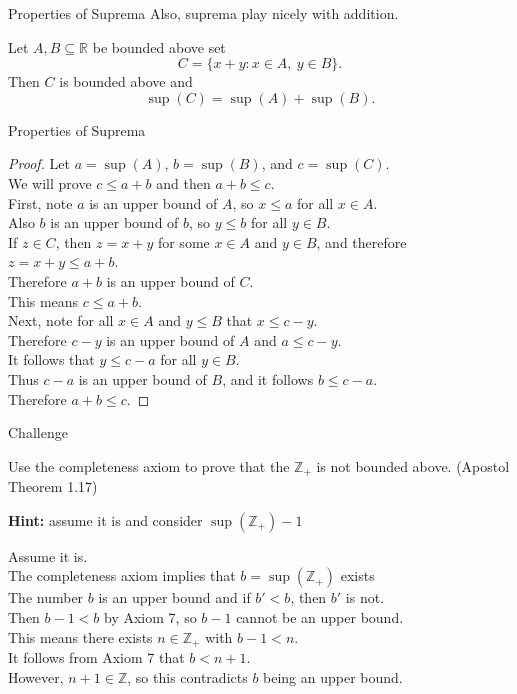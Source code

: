 \documentclass{beamer}
\begin{document}
\begin{frame}{Properties of Suprema}
Also, suprema play nicely with addition.
\begin{thm}
Let $A,B\subseteq\mathbb{R}$ be bounded above set
$$C = \{x+y: x\in A,\ y\in B\}.$$
Then $C$ is bounded above and
$$\sup(C) = \sup(A) + \sup(B).$$
\end{thm}
\end{frame}
\begin{frame}{Properties of Suprema}
\begin{proof}
Let $a = \sup(A)$, $b = \sup(B)$, and $c=\sup(C)$. \\
\pause
We will prove $c \leq a+b$ and then $a+b\leq c$. \\
\pause
First, note $a$ is an upper bound of $A$, so $x\leq a$ for all $x\in A$. \\
\pause
Also $b$ is an upper bound of $b$, so $y\leq b$ for all $y\in B$. \\
\pause
If $z\in C$, then $z=x+y$ for some $x\in A$ and $y\in B$, and therefore $z = x+y \leq a+b$. \\
\pause
Therefore $a+b$ is an upper bound of $C$. \\
\pause
This means $c\leq a+b$. \\
\pause
Next, note for all $x\in A$ and $y\leq B$ that $x\leq c-y$. \\
\pause
Therefore $c-y$  is an upper bound of $A$ and $a\leq c-y$. \\
\pause
It follows that $y\leq c-a$ for all $y\in B$. \\
\pause
Thus $c-a$ is an upper bound of $B$, and it follows $b\leq c-a$. \\
\pause
Therefore $a+b\leq c$.
\end{proof}
\end{frame}


\begin{frame}{Challenge}
\begin{prob}
Use the completeness axiom to prove that the $\mathbb Z_+$ is not bounded above.
(Apostol Theorem 1.17)
\end{prob}
\pause
\textbf{Hint:} assume it is and consider $\sup(\mathbb Z_+)-1$
\pause
\begin{soln}
Assume it is.\\\pause
The completeness axiom implies that $b=\sup(\mathbb Z_+)$ exists\\\pause
The number $b$ is an upper bound and if $b' < b$, then $b'$ is not.\\\pause
Then $b-1 < b$ by Axiom 7, so $b-1$ cannot be an upper bound.\\\pause
This means there exists $n\in\mathbb{Z}_+$ with $b-1 < n$.\\\pause
It follows from Axiom 7 that $b < n+1$.\\\pause
However, $n+1\in\mathbb{Z}$, so this contradicts $b$ being an upper bound.
\end{soln}
\end{frame}
\end{document}
